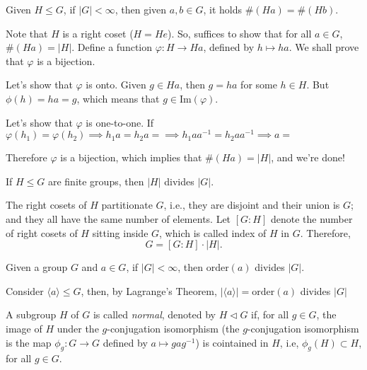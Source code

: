 
\begin{lem}
	Given $H \leq G$, if $|G| < \infty$, then given $a, b \in G$, it holds $\#(Ha) = \#(Hb)$.
\end{lem}

\begin{dem}
	Note that $H$ is a right coset ($H = He$). So, suffices to show that for all $a \in G$, $\#(Ha) = |H|$.
	Define a function $\varphi : H \to Ha$, defined by $h \mapsto ha$. We shall prove that $\varphi$ is a bijection.

	Let's show that $\varphi$ is onto. Given $g \in Ha$, then $g = ha$ for some $h \in H$. But $\phi(h) = ha = g$, which means that $g \in \mathrm{Im}(\varphi)$. 

	Let's show that $\varphi$ is one-to-one. If $\varphi(h_1) = \varphi(h_2) \implies h_1a = h_2a = \implies h_1aa^{-1} = h_2aa^{-1} \implies a = $

	Therefore $\varphi$ is a bijection, which implies that $\#(Ha) = |H|$, and we're done!
\end{dem}

\begin{thm}
	If $H \le G$ are finite groups, then $|H|$ divides $|G|$.
\end{thm}

\begin{dem}
	The right cosets of $H$ partitionate $G$, i.e., they are disjoint and their union is $G$; and they all have the same number of elements. Let $[G:H]$ denote the number of right cosets of $H$ sitting inside $G$, which is called index of $H$ in $G$.
	Therefore, \[G = [G:H] \cdot |H|.\]
\end{dem}

\begin{cor}
	Given a group $G$ and $a \in G$, if $|G| < \infty$, then $\mathrm{order}(a)$ divides $|G|$.
\end{cor}

\begin{dem}
	Consider $\langle a \rangle \leq G$, then, by Lagrange's Theorem, $|\langle a \rangle| = \mathrm{order}(a)$ divides $|G|$
\end{dem}

\begin{defn}
	A subgroup $H$ of $G$ is called \emph{normal}, denoted by $H \vartriangleleft G$ if, for all $g \in G$, the image of $H$ under the  $g$-conjugation isomorphism (the $g$-conjugation isomorphism is the map $\phi_g : G \to G$ defined by $a \mapsto g a g^{-1}$) is cointained in $H$, i.e, $\phi_g(H) \subset H$, for all $g \in G$.
\end{defn}

